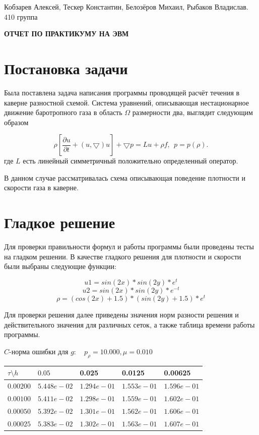 \documentclass[a4paper, 25pt]{article}
\begin{document}
\begin{flushright}
Кобзарев Алексей, Тескер Константин, Белозёров Михаил, Рыбаков Владислав.
\\
410 группа
\end{flushright}

\begin{center}
\bfseries ОТЧЕТ ПО ПРАКТИКУМУ НА ЭВМ
\end{center}

\section{Постановка задачи}

Была поставлена задача написания программы проводящей расчёт течения в каверне разностной схемой. 
Система уравнений, описывающая нестационарное движение баротропного газа в область $\Omega$ размерности два, выглядит следующим образом

\begin{equation}
 \rho[\frac{\partial u}{\partial t} + (u, \bigtriangledown)u]  + \bigtriangledown p = Lu + \rho f, ~~
 p = p (\rho).
\end{equation}
где $L$ есть линейный симметричный положительно определенный оператор.

В данном случае рассматривалась схема описывающая поведение плотности и скорости газа в каверне.

\section{Гладкое решение}

Для проверки правильности формул и работы программы были проведены тесты на гладком решении. В качестве гладкого решения для плотности и скорости были выбраны следующие функции:

$$u1 = sin (2x) * sin (2y) * e^t$$
$$u2 = sin (2x) * sin (2y) * e^{-t}$$
$$\rho = (cos (2x) + 1.5) * (sin (2y) + 1.5) * e^t$$


Для проверки решения далее приведены значения норм разности решения и действительного значения для различных сеток, а также таблица времени работы программы.

\begin{center}
 $C$-норма ошибки для $g: \quad p_{\rho}=10.000, \mu = 0.010 $
\begin{tabular}{|p{0.6in}|p{0.7in}|p{0.7in}|p{0.7in}|p{0.7in}|} \hline
$\tau\setminus h$ & $0.05$ & 0.025& 0.0125 & 0.00625 \\ \hline
$0.00200$ & $5.448e-02$ &$1.294e-01$ &$1.553e-01$ &$1.596e-01$  \\ \hline
$0.00100$ & $5.411e-02$ &$1.298e-01$ &$1.559e-01$ &$1.602e-01$  \\ \hline
$0.00050$ & $5.392e-02$ &$1.301e-01$ &$1.562e-01$ &$1.606e-01$  \\ \hline
$0.00025$ & $5.383e-02$ &$1.302e-01$ &$1.563e-01$ &$1.607e-01$  \\ \hline
\end{tabular}\\[20pt]
\end{center}
\end{document}
